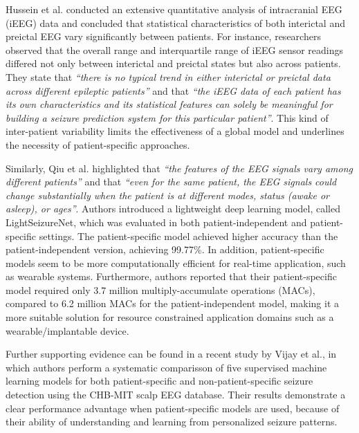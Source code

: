 \documentclass{article}
\begin{document}
				Hussein et al.\cite{hussein} conducted an extensive quantitative analysis of intracranial EEG (iEEG) 
				data and concluded that statistical characteristics 
				of both interictal and preictal EEG vary significantly between patients. 
				For instance, researchers observed that the overall range and interquartile 
				range of iEEG sensor readings differed not only between interictal and preictal 
				states but also across patients. 
				They state that \textit{“there is no typical trend in either interictal or preictal 
				data across different epileptic patients”} and that 
				\textit{“the iEEG data of each patient has its own characteristics 
				and its statistical features can solely be meaningful for building a 
				seizure prediction system for this particular patient”}. 
				This kind of inter-patient variability limits the
				effectiveness of a global model and underlines the necessity of 
				patient-specific approaches.

				Similarly, Qiu et al.\cite{lightseizurenet} highlighted that \textit{“the features of the EEG signals 
				vary among different patients”} and that 
				\textit{“even for the same patient, the EEG signals could change substantially when the patient is 
				at different modes, status (awake or asleep), or ages”}.
				Authors introduced a lightweight deep learning model, called LightSeizureNet, 
				which was evaluated in both patient-independent and patient-specific settings. 
				The patient-specific model achieved higher accuracy than the patient-independent version, achieving 99.77\%. 
				In addition, patient-specific models seem to be more computationally efficient 
				for real-time application, such as wearable systems. 
				Furthermore, authors reported that their patient-specific model required only 3.7 million 
				multiply-accumulate operations (MACs), 
				compared to 6.2 million MACs for the patient-independent model, making it a more suitable solution for 
				resource constrained application domains
				such as a wearable/implantable device.
				
				Further supporting evidence can be found in a recent study by Vijay et al.\cite{vijay2025supervised}, 
				in which authors perform a systematic comparisson of five supervised machine learning models
				for both patient-specific and non-patient-specific seizure detection using the CHB-MIT scalp EEG database. 
				Their results demonstrate a clear performance advantage when patient-specific models are used, 
				because of their ability of understanding and learning from personalized seizure patterns. 


			\newpage




\end{document}
